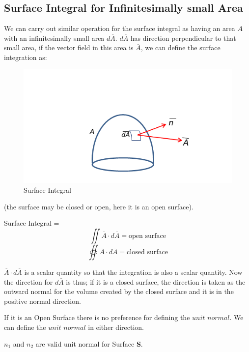 \subsection{Surface Integral for Infinitesimally small Area}
We can carry out similar operation for the surface integral as having an area $A$ with an infinitesimally small area $d\overline{A}$. $d\overline{A}$ has direction perpendicular to that small area, if the vector field in this area is $\overline{A}$, we can define the surface integration as:
\begin{figure}
	\centering
	\includegraphics[width=1\linewidth]{./graphics/surface_Int}
	\caption{Surface Integral}
\end{figure}
(the surface may be closed or open, here it is an open surface).

Surface Integral =
\begin{equation*}
{   \iint \overline{A} \cdot d\overline{A}= \text{open surface} }
\end{equation*}
\begin{equation}
\oiint \overline{A} \cdot d\overline{A} = \text{closed surface}
\end{equation}

$\overline{A} \cdot d\overline{A}$ is a scalar quantity so that the integration is also a scalar quantity. Now the direction for $d\overline{A}$ is thus; if it is a closed surface, the direction is taken as the outward normal for the volume created by the closed surface and it is in the positive normal direction.

If it is an Open Surface there is no preference for defining the $unit$ $normal$. We can define the $unit$ $normal$ in either direction.

$n_1$ and $n_2$ are valid unit normal for Surface \textbf{S}.

